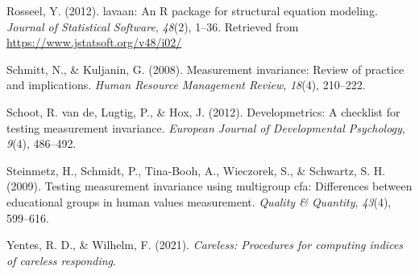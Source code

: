 \documentclass[
  english,
  man]{apa6}
\begin{document}
\leavevmode\hypertarget{ref-R-lavaan}{}%
Rosseel, Y. (2012). lavaan: An R package for structural equation modeling. \emph{Journal of Statistical Software}, \emph{48}(2), 1--36. Retrieved from \url{https://www.jstatsoft.org/v48/i02/}

\leavevmode\hypertarget{ref-schmitt2008measurement}{}%
Schmitt, N., \& Kuljanin, G. (2008). Measurement invariance: Review of practice and implications. \emph{Human Resource Management Review}, \emph{18}(4), 210--222.

\leavevmode\hypertarget{ref-vandevelopmetrics}{}%
Schoot, R. van de, Lugtig, P., \& Hox, J. (2012). Developmetrics: A checklist for testing measurement invariance. \emph{European Journal of Developmental Psychology}, \emph{9}(4), 486--492.

\leavevmode\hypertarget{ref-steinmetz2009testing}{}%
Steinmetz, H., Schmidt, P., Tina-Booh, A., Wieczorek, S., \& Schwartz, S. H. (2009). Testing measurement invariance using multigroup cfa: Differences between educational groups in human values measurement. \emph{Quality \& Quantity}, \emph{43}(4), 599--616.

\leavevmode\hypertarget{ref-R-careless}{}%
Yentes, R. D., \& Wilhelm, F. (2021). \emph{Careless: Procedures for computing indices of careless responding}.

\endgroup
\end{document}
